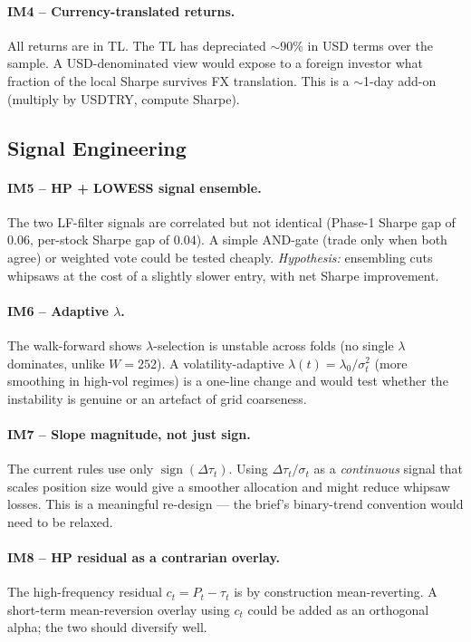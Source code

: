 \documentclass[11pt,a4paper]{article}
\begin{document}
\paragraph{IM4 -- Currency-translated returns.} All returns are in TL. The TL
has depreciated $\sim$90\% in USD terms over the sample. A USD-denominated
view would expose to a foreign investor what fraction of the local
Sharpe survives FX translation. This is a $\sim$1-day add-on (multiply by
USDTRY, compute Sharpe).

\subsection{Signal Engineering}

\paragraph{IM5 -- HP + LOWESS signal ensemble.} The two LF-filter signals are
correlated but not identical (Phase-1 Sharpe gap of $0.06$, per-stock Sharpe
gap of $0.04$). A simple AND-gate (trade only when both agree) or weighted
vote could be tested cheaply. \emph{Hypothesis:} ensembling cuts whipsaws at
the cost of a slightly slower entry, with net Sharpe improvement.

\paragraph{IM6 -- Adaptive $\lambda$.} The walk-forward shows
$\lambda$-selection is unstable across folds (no single $\lambda$ dominates,
unlike $W{=}252$). A volatility-adaptive $\lambda(t) = \lambda_0 / \sigma_t^2$
(more smoothing in high-vol regimes) is a one-line change and would test
whether the instability is genuine or an artefact of grid coarseness.

\paragraph{IM7 -- Slope magnitude, not just sign.} The current rules use only
$\operatorname{sign}(\Delta \tau_t)$. Using $\Delta \tau_t / \sigma_t$ as a
\emph{continuous} signal that scales position size would give a smoother
allocation and might reduce whipsaw losses. This is a meaningful re-design ---
the brief's binary-trend convention would need to be relaxed.

\paragraph{IM8 -- HP residual as a contrarian overlay.} The high-frequency
residual $c_t = P_t - \tau_t$ is by construction mean-reverting. A short-term
mean-reversion overlay using $c_t$ could be added as an orthogonal alpha; the
two should diversify well.
\end{document}
